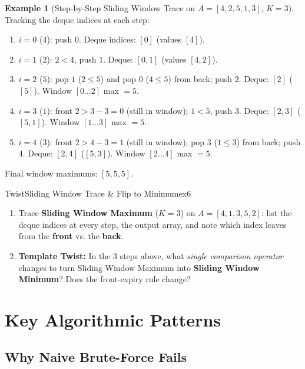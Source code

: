 \documentclass[11pt,a4paper]{article}
\theoremstyle{definition}
\newtheorem{example}{Example}[section]
\begin{document}
\begin{example}[Step-by-Step Sliding Window Trace on $A = {[4, 2, 5, 1, 3]}$, $K = 3$]
Tracking the deque indices at each step:
\begin{enumerate}
    \item $i = 0$ ($4$): push $0$. Deque indices: $[0]$ (values $[4]$).
    \item $i = 1$ ($2$): $2 < 4$, push $1$. Deque: $[0, 1]$ (values $[4, 2]$).
    \item $i = 2$ ($5$): pop $1$ ($2 \le 5$) and pop $0$ ($4 \le 5$) from back; push $2$. Deque: $[2]$ ($[5]$). Window $[0 \dots 2]$ max $= 5$.
    \item $i = 3$ ($1$): front $2 > 3 - 3 = 0$ (still in window); $1 < 5$, push $3$. Deque: $[2, 3]$ ($[5, 1]$). Window $[1 \dots 3]$ max $= 5$.
    \item $i = 4$ ($3$): front $2 > 4 - 3 = 1$ (still in window); pop $3$ ($1 \le 3$) from back; push $4$. Deque: $[2, 4]$ ($[5, 3]$). Window $[2 \dots 4]$ max $= 5$.
\end{enumerate}
Final window maximums: $[5, 5, 5]$.
\end{example}

\begin{tryitbox}{Twist}{Sliding Window Trace \& Flip to Minimum}{ex6}
\begin{enumerate}
    \item Trace \textbf{Sliding Window Maximum} ($K = 3$) on $A = [4, 1, 3, 5, 2]$: list the deque indices at every step, the output array, and note which index leaves from the \textbf{front} vs. the \textbf{back}.
    \item \textbf{Template Twist:} In the 3 steps above, what \emph{single comparison operator} changes to turn Sliding Window Maximum into \textbf{Sliding Window Minimum}? Does the front-expiry rule change?
\end{enumerate}
\end{tryitbox}

\section{Key Algorithmic Patterns}

\subsection{Why Naive Brute-Force Fails}
\end{document}
